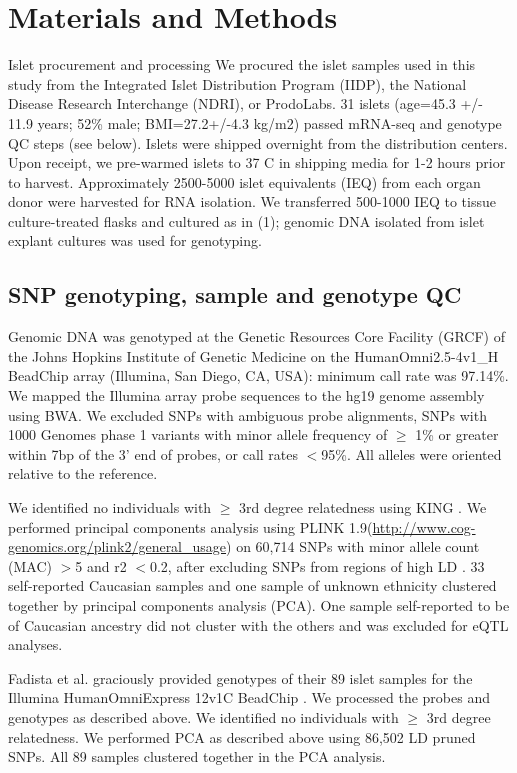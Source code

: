 \section{Materials and Methods}
Islet procurement and processing 
We procured the islet samples used in this study from the Integrated Islet Distribution Program (IIDP), the National Disease Research Interchange (NDRI), or ProdoLabs. 31 islets (age=45.3 +/- 11.9 years; 52\% male; BMI=27.2+/-4.3 kg/m2) passed mRNA-seq and genotype QC steps (see below). Islets were shipped overnight from the distribution centers.  Upon receipt, we pre-warmed islets to 37 C in shipping media for 1-2 hours prior to harvest.  Approximately 2500-5000 islet equivalents (IEQ) from each organ donor were harvested for RNA isolation. We transferred 500-1000 IEQ to tissue culture-treated flasks and cultured as in (1); genomic DNA isolated from islet explant cultures was used for genotyping.

\subsection{SNP genotyping, sample and genotype QC} 
Genomic DNA was genotyped at the Genetic Resources Core Facility (GRCF) of the Johns Hopkins Institute of Genetic Medicine on the HumanOmni2.5-4v1\_H BeadChip array (Illumina, San Diego, CA, USA): minimum call rate was 97.14\%. We mapped the Illumina array probe sequences to the hg19 genome assembly using BWA. We excluded SNPs with ambiguous probe alignments, SNPs with 1000 Genomes phase 1 variants with minor allele frequency of $\geq$ 1\% or greater within 7bp of the 3' end of probes, or call rates $<$95\%. All alleles were oriented relative to the reference. 

We identified no individuals with $\geq$ 3rd degree relatedness using KING \cite{manichaikulRobustRelationshipInference2010}. We performed principal components analysis using PLINK 1.9(\url{http://www.cog-genomics.org/plink2/general\_usage}) on 60,714 SNPs with minor allele count (MAC) $>$5 and r2 $<$0.2, after excluding SNPs from regions of high LD \cite{priceLongRangeLDCan2008}. 33 self-reported Caucasian samples and one sample of unknown ethnicity clustered together by principal components analysis (PCA). One sample self-reported to be of Caucasian ancestry did not cluster with the others and was excluded for eQTL analyses. 

Fadista et al. graciously provided genotypes of their 89 islet samples for the Illumina HumanOmniExpress 12v1C BeadChip \cite{fadistaGlobalGenomicTranscriptomic2014}. We processed the probes and genotypes as described above.  We identified no individuals with $\geq$ 3rd degree relatedness. We performed PCA as described above using 86,502 LD pruned SNPs. All 89 samples clustered together in the PCA analysis.


